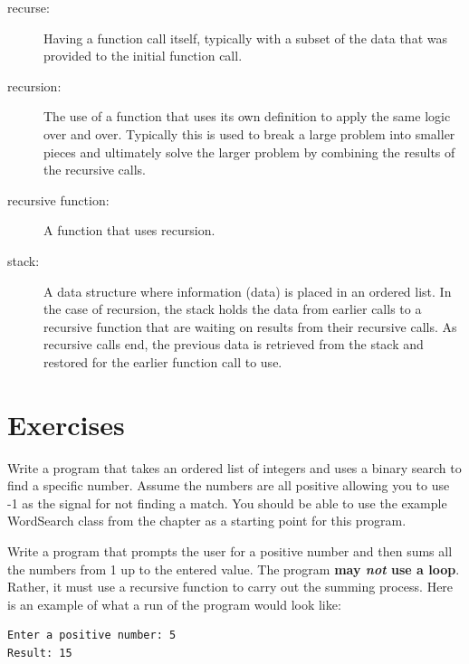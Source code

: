 \begin{description}

\item[recurse:] Having a function call itself, typically with a subset of the data that was provided to the initial function call. 

\item[recursion:] The use of a function that uses its own definition to apply the same logic over and over. Typically this is used to break a large problem into smaller pieces and ultimately solve the larger problem by combining the results of the recursive calls.

\item[recursive function:] A function that uses recursion.

\item[stack:] A data structure where information (data) is placed in an ordered list. In the case of recursion, the stack holds the data from earlier calls to a recursive function that are waiting on results from their recursive calls. As recursive calls end, the previous data is retrieved from the stack and restored for the earlier function call to use.

\end{description}

\newpage

\section{Exercises}

\begin{ex}
Write a program that takes an ordered list of integers and uses a binary search to find a specific number. Assume the numbers are all positive allowing you to use -1 as the signal for not finding a match. You should be able to use the example WordSearch class from the chapter as a starting point for this program.
\end{ex}

\begin{ex}
Write a program that prompts the user for a positive number and then sums all the numbers from 1 up to the entered value. The program \textbf{may \textit{not} use a loop}. Rather, it must use a recursive function to carry out the summing process.
Here is an example of what a run of the program would look like:

\beforeverb
\begin{verbatim}
Enter a positive number: 5
Result: 15
\end{verbatim}
\afterverb

\end{ex}


